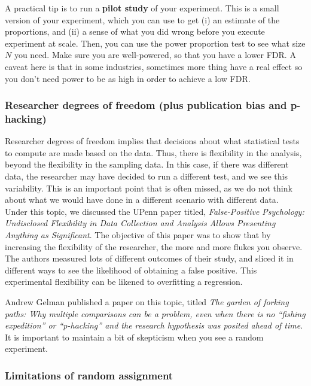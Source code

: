 A practical tip is to run a \textbf{pilot study} of your experiment.  This is a small version of your experiment, which you can use to get (i) an estimate of the proportions, and (ii) a sense of what you did wrong before you execute experiment at scale.  Then, you can use the power proportion test to see what size $N$ you need.  Make sure you are well-powered, so that you have a lower FDR.  A caveat here is that in some industries, sometimes more thing have a real effect so you don't need power to be as high in order to achieve a low FDR. 

\subsubsection{Researcher degrees of freedom (plus publication bias and p-hacking)}

Researcher degrees of freedom implies that decisions about what statistical tests to compute are made based on the data.  Thus, there is flexibility in the analysis, beyond the flexibility in the sampling data.  In this case, if there was different data, the researcher may have decided to run a different test, and we see this variability.  This is an important point that is often missed, as we do not think about what we would have done in a different scenario with different data.\\

Under this topic, we discussed the UPenn paper titled, \textit{False-Positive Psychology: Undisclosed Flexibility in Data Collection and Analysis Allows Presenting Anything as Significant}.  The objective of this paper was to show that by increasing the flexibility of the researcher, the more and more flukes you observe.  The authors measured lots of different outcomes of their study, and sliced it in different ways to see the likelihood of obtaining a false positive.  This experimental flexibility can be likened to overfitting a regression.

Andrew Gelman published a paper on this topic, titled \textit{The garden of forking paths: Why multiple comparisons can be a problem,
even when there is no “fishing expedition” or “p-hacking” and the research hypothesis was posited ahead of time}.  It is important to maintain a bit of skepticism when you see a random experiment. 

\subsubsection{Limitations of random assignment}

